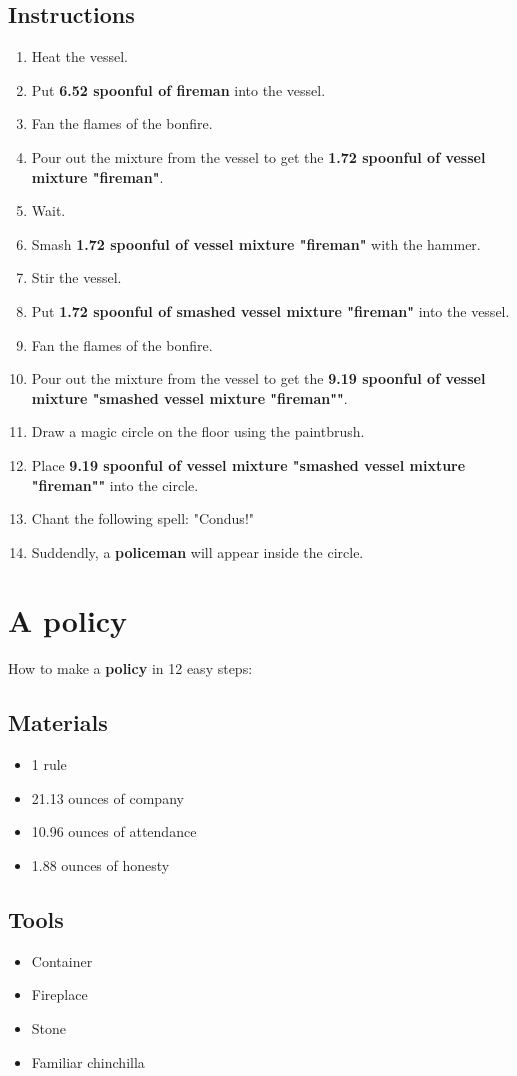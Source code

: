 \documentclass{article}
\begin{document}
\subsection{Instructions}\begin{enumerate}
\item 
Heat the vessel.
\item 
Put \textbf{6.52 spoonful of fireman} into the vessel.
\item 
Fan the flames of the bonfire.
\item 
Pour out the mixture from the vessel to get the \textbf{1.72 spoonful of vessel mixture "fireman"}.
\item 
Wait.
\item 
Smash \textbf{1.72 spoonful of vessel mixture "fireman"} with the hammer.
\item 
Stir the vessel.
\item 
Put \textbf{1.72 spoonful of smashed vessel mixture "fireman"} into the vessel.
\item 
Fan the flames of the bonfire.
\item 
Pour out the mixture from the vessel to get the \textbf{9.19 spoonful of vessel mixture "smashed vessel mixture "fireman""}.
\item 
Draw a magic circle on the floor using the paintbrush.
\item 
Place \textbf{9.19 spoonful of vessel mixture "smashed vessel mixture "fireman""} into the circle.
\item 
Chant the following spell: "Condus!"
\item 
Suddendly, a \textbf{policeman} will appear inside the circle.
\end{enumerate}
\newpage
\section{A policy}How to make a \textbf{policy} in 12 easy steps:

\subsection{Materials}\begin{itemize}
\item 
1 rule
\item 
21.13 ounces of company
\item 
10.96 ounces of attendance
\item 
1.88 ounces of honesty
\end{itemize}
\subsection{Tools}\begin{itemize}
\item 
Container
\item 
Fireplace
\item 
Stone
\item 
Familiar chinchilla
\end{itemize}
\end{document}
